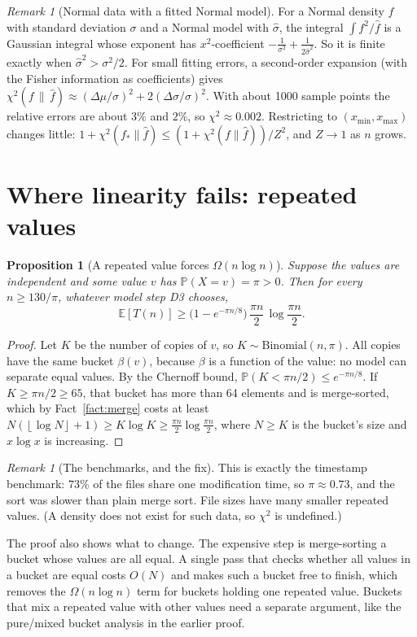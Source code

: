 \documentclass[11pt]{article}
\newtheorem{proposition}[theorem]{Proposition}
\theoremstyle{definition}
\theoremstyle{remark}
\newtheorem{remark}[theorem]{Remark}
\newcommand{\fh}{\widehat{f}}
\newcommand{\E}{\mathbb{E}}
\newcommand{\Prob}{\mathbb{P}}
\newcommand{\floor}[1]{\left\lfloor #1 \right\rfloor}
\newcommand{\xmin}{x_{\min}}
\newcommand{\xmax}{x_{\max}}
\begin{document}
\begin{remark}[Normal data with a fitted Normal model]
For a Normal density $f$ with standard deviation $\sigma$ and a Normal model
with $\hat\sigma$, the integral $\int f^2/\fh$ is a Gaussian integral whose
exponent has $x^2$-coefficient $-\frac1{\sigma^2}+\frac1{2\hat\sigma^2}$. So
it is finite exactly when $\hat\sigma^2>\sigma^2/2$. For small fitting
errors, a second-order expansion (with the Fisher information as
coefficients) gives
$\chi^2(f\,\|\,\fh)\approx(\Delta\mu/\sigma)^2+2(\Delta\sigma/\sigma)^2$.
With about 1000 sample points the relative errors are about $3\%$ and
$2\%$, so $\chi^2\approx0.002$. Restricting to $(\xmin,\xmax)$ changes little:
$1+\chi^2(f_\ast\|\fh)\le(1+\chi^2(f\|\fh))/Z^2$, and $Z\to1$ as $n$ grows.
\end{remark}

\section{Where linearity fails: repeated values}

\begin{proposition}[A repeated value forces $\Omega(n\log n)$]\label{prop:atoms}
Suppose the values are independent and some value $v$ has
$\Prob(X=v)=\pi>0$. Then for every $n\ge130/\pi$, whatever model step D3
chooses,
\[
\E[T(n)]\ge\bigl(1-e^{-\pi n/8}\bigr)\,\frac{\pi n}{2}\,\log\frac{\pi n}{2}.
\]
\end{proposition}
\begin{proof}
Let $K$ be the number of copies of $v$, so $K\sim\mathrm{Binomial}(n,\pi)$.
All copies have the same bucket $\beta(v)$, because $\beta$ is a function
of the value: no model can separate equal values. By the Chernoff bound,
$\Prob(K<\pi n/2)\le e^{-\pi n/8}$. If $K\ge\pi n/2\ge65$, that bucket has
more than 64 elements and is merge-sorted, which by Fact~\ref{fact:merge}
costs at least $N(\floor{\log N}+1)\ge K\log K\ge\frac{\pi n}2\log\frac{\pi n}2$,
where $N\ge K$ is the bucket's size and $x\log x$ is increasing.
\end{proof}

\begin{remark}[The benchmarks, and the fix]
This is exactly the timestamp benchmark: $73\%$ of the files share one
modification time, so $\pi\approx0.73$, and the sort was slower than plain
merge sort. File sizes have many smaller repeated values. (A density does
not exist for such data, so $\chi^2$ is undefined.)

The proof also shows what to change. The expensive step is merge-sorting a
bucket whose values are all equal. A single pass that checks whether all
values in a bucket are equal costs $O(N)$ and makes such a bucket free to
finish, which removes the $\Omega(n\log n)$ term for buckets holding one
repeated value. Buckets that mix a repeated value with other values need a
separate argument, like the pure/mixed bucket analysis in the earlier
proof.
\end{remark}
\end{document}
